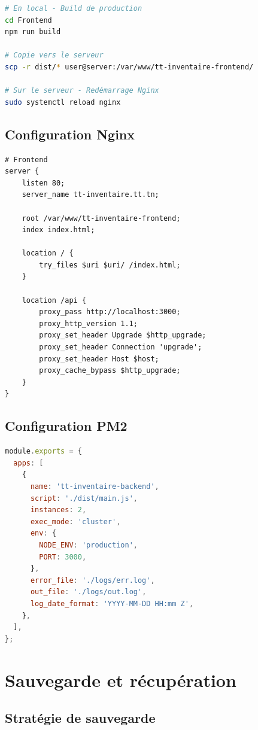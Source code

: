 \begin{lstlisting}[language=bash, caption=Déploiement du frontend]
# En local - Build de production
cd Frontend
npm run build

# Copie vers le serveur
scp -r dist/* user@server:/var/www/tt-inventaire-frontend/

# Sur le serveur - Redémarrage Nginx
sudo systemctl reload nginx
\end{lstlisting}

\subsection{Configuration Nginx}

\begin{lstlisting}[caption=Configuration Nginx - tt-inventaire.conf]
# Frontend
server {
    listen 80;
    server_name tt-inventaire.tt.tn;

    root /var/www/tt-inventaire-frontend;
    index index.html;

    location / {
        try_files $uri $uri/ /index.html;
    }

    location /api {
        proxy_pass http://localhost:3000;
        proxy_http_version 1.1;
        proxy_set_header Upgrade $http_upgrade;
        proxy_set_header Connection 'upgrade';
        proxy_set_header Host $host;
        proxy_cache_bypass $http_upgrade;
    }
}
\end{lstlisting}

\subsection{Configuration PM2}

\begin{lstlisting}[language=JavaScript, caption=ecosystem.config.js]
module.exports = {
  apps: [
    {
      name: 'tt-inventaire-backend',
      script: './dist/main.js',
      instances: 2,
      exec_mode: 'cluster',
      env: {
        NODE_ENV: 'production',
        PORT: 3000,
      },
      error_file: './logs/err.log',
      out_file: './logs/out.log',
      log_date_format: 'YYYY-MM-DD HH:mm Z',
    },
  ],
};
\end{lstlisting}

\section{Sauvegarde et récupération}

\subsection{Stratégie de sauvegarde}

